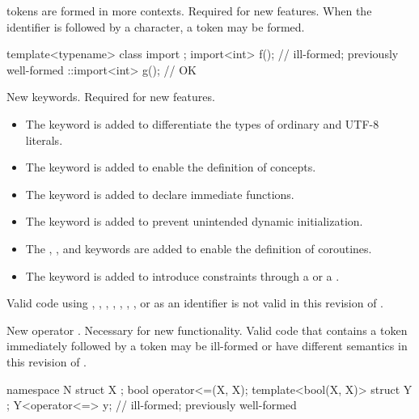 \change
{} tokens are formed in more contexts.
\rationale
Required for new features.
\effect
When the identifier 
is followed by a \tcode{<} character,
a  token may be formed.
\begin{example}
\begin{codeblock}
template<typename> class import {};
import<int> f();                // ill-formed; previously well-formed
::import<int> g();              // OK
\end{codeblock}
\end{example}

\change
New keywords.
\rationale
Required for new features.
\begin{itemize}
\item
{}%
The  keyword is added to differentiate
the types of ordinary and UTF-8 literals.
\item
The  keyword is
added to enable the definition of concepts.
\item
The  keyword is added to
declare immediate functions.
\item
The  keyword is added to
prevent unintended dynamic initialization.
\item
The , , and  keywords are added
to enable the definition of coroutines.
\item
The  keyword is added
to introduce constraints through a 
or a .
\end{itemize}
\effectafteritemize
Valid \CppXVII{} code using
,
,
,
,
, , ,
or 
as an identifier is not valid in this revision of \Cpp{}.

\change
New operator \tcode{<=>}.
\rationale
Necessary for new functionality.
\effect
Valid \CppXVII{} code that contains a \tcode{<=} token
immediately followed by a \tcode{>} token
may be ill-formed or have different semantics in this revision of \Cpp{}.
\begin{example}
\begin{codeblock}
namespace N {
  struct X {};
  bool operator<=(X, X);
  template<bool(X, X)> struct Y {};
  Y<operator<=> y;              // ill-formed; previously well-formed
}
\end{codeblock}
\end{example}

